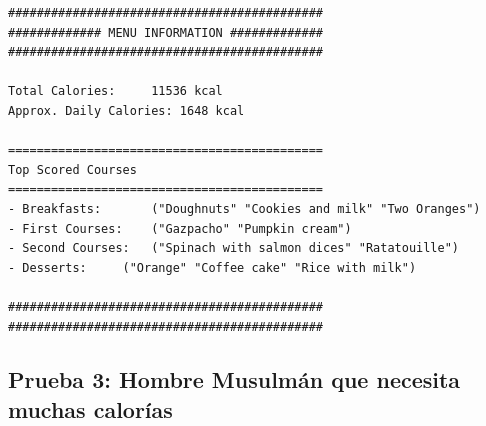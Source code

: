 \documentclass[12]{article}
\begin{document}
\begin{lstlisting}
############################################
############# MENU INFORMATION #############
############################################

Total Calories:		11536 kcal
Approx. Daily Calories:	1648 kcal

============================================
Top Scored Courses
============================================
- Breakfasts:		("Doughnuts" "Cookies and milk" "Two Oranges")
- First Courses:	("Gazpacho" "Pumpkin cream")
- Second Courses:	("Spinach with salmon dices" "Ratatouille")
- Desserts:		("Orange" "Coffee cake" "Rice with milk")

############################################
############################################
\end{lstlisting}

\subsection{Prueba 3: Hombre Musulmán que necesita muchas calorías}
\end{document}
